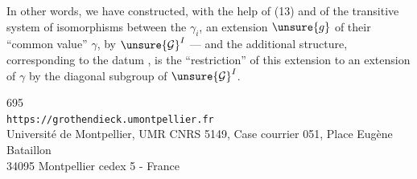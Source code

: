 In other words, we have constructed, with the help of (13) and of the transitive system of isomorphisms between the $\gamma_i$, an extension $\unsure{g}$ of their ``common value'' $\gamma$, by $\unsure{\mathcal G}^I$ --- and the additional structure, corresponding to the datum , is the ``restriction'' of this extension to an extension of $\gamma$ by the diagonal subgroup of $\unsure{\mathcal G}^I$.


\begin{center}
695\\
\texttt{https://grothendieck.umontpellier.fr}\\
Université de Montpellier, UMR CNRS 5149, Case courrier 051, Place Eugène Bataillon\\
34095 Montpellier cedex 5 - France
\end{center}